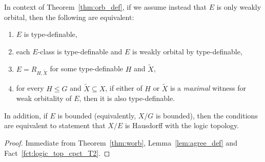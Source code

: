 	\begin{thm}
		\label{thm:worb_def}
		In context of Theorem~\ref{thm:orb_def}, if we assume instead that $E$ is only weakly orbital, then the following are equivalent:
		\begin{enumerate}
			\item
			$E$ is type-definable,
			\item
			each $E$-class is type-definable and $E$ is weakly orbital by type-definable,
			\item
			$E=R_{H,\tilde X}$ for some type-definable $H$ and $\tilde X$,
			\item
			for every $H\leq G$ and $\tilde X\subseteq X$, if either of $H$ or $\tilde X$ is a \emph{maximal} witness for weak orbitality of $E$, then it is also type-definable.
		\end{enumerate}
		In addition, if $E$ is bounded (equivalently, $X/G$ is bounded), then the conditions are equivalent to statement that $X/E$ is Hausdorff with the logic topology.
	\end{thm}
	\begin{proof}
		Immediate from Theorem~\ref{thm:worb}, Lemma~\ref{lem:agree_def} and Fact~\ref{fct:logic_top_cpct_T2}.
	\end{proof}
	
